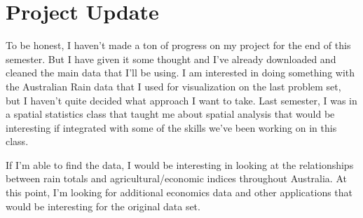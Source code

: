 \documentclass{article}
\begin{document}
\section{Project Update} 
To be honest, I haven't made a ton of progress on my project for the end of this semester. But I have given it some thought and I've already downloaded and cleaned the main data that I'll be using. I am interested in doing something with the Australian Rain data that I used for visualization on the last problem set, but I haven't quite decided what approach I want to take. Last semester, I was in a spatial statistics class that taught me about spatial analysis that would be interesting if integrated with some of the skills we've been working on in this class. 

If I'm able to find the data, I would be interesting in looking at the relationships between rain totals and agricultural/economic indices throughout Australia. At this point, I'm looking for additional economics data and other applications that would be interesting for the original data set. 
\end{document}

